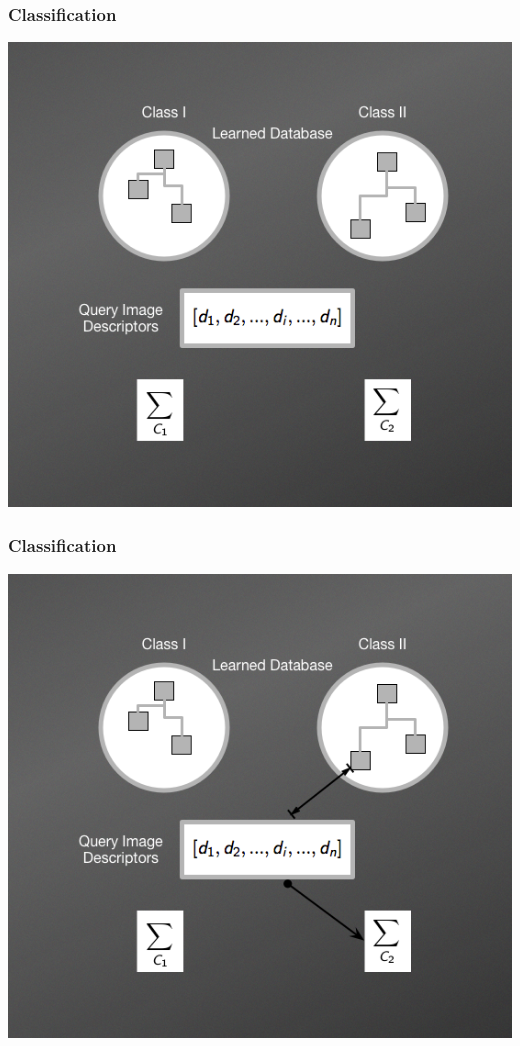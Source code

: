 \documentclass[aspectratio=169]{beamer}
\begin{document}
    \begin{frame}
        \frametitle{Classification}
        \begin{center}
            \item \includegraphics[scale=0.38]{images/NBNNMethod1.png}     
        \end{center}
    \end{frame}
    
    \begin{frame}
        \frametitle{Classification}
        \begin{center}
            \item \includegraphics[scale=0.38]{images/NBNNMethod2.png}        
        \end{center}
    \end{frame}
    
\end{document}
